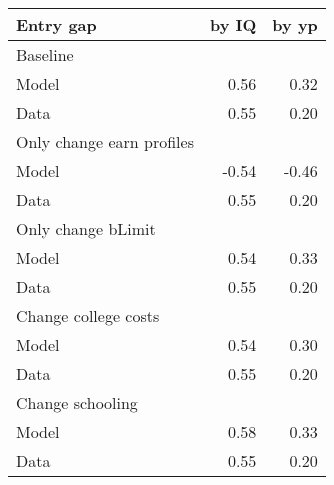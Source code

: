 \begin{tabular}{lrr}
\hline
Entry gap & by IQ  & by yp  \\
\hline
Baseline &   &   \\
Model & 0.56  & 0.32  \\
Data & 0.55  & 0.20  \\
Only change earn profiles &   &   \\
Model & -0.54  & -0.46  \\
Data & 0.55  & 0.20  \\
Only change bLimit &   &   \\
Model & 0.54  & 0.33  \\
Data & 0.55  & 0.20  \\
Change college costs &   &   \\
Model & 0.54  & 0.30  \\
Data & 0.55  & 0.20  \\
Change schooling &   &   \\
Model & 0.58  & 0.33  \\
Data & 0.55  & 0.20  \\
\hline
\end{tabular}%
